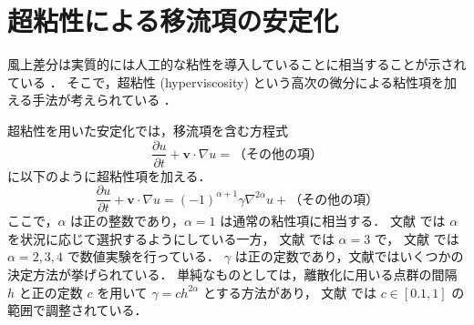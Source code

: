 \section{超粘性による移流項の安定化}\label{sec:pde_advection_hyperviscosity}

風上差分は実質的には人工的な粘性を導入していることに相当することが示されている \cite{Arakawa1994}．
そこで，超粘性 (hyperviscosity) という高次の微分による粘性項を加える手法が考えられている%
\cite{Shankar2018,Vaupotic2024,Rot2026}．

超粘性を用いた安定化では，移流項を含む方程式
\begin{equation}
    \frac{\partial u}{\partial t} + \bm{v} \cdot \nabla u = \text{（その他の項）}
\end{equation}
に以下のように超粘性項を加える．
\begin{equation}
    \frac{\partial u}{\partial t} + \bm{v} \cdot \nabla u = (-1)^{\alpha + 1} \gamma \nabla^{2\alpha} u + \text{（その他の項）}
\end{equation}
ここで，$\alpha$ は正の整数であり，$\alpha = 1$ は通常の粘性項に相当する．
文献 \cite{Shankar2018} では $\alpha$ を状況に応じて選択するようにしている一方，
文献 \cite{Vaupotic2024} では $\alpha=3$ で，
文献 \cite{Rot2026} では $\alpha=2,3,4$ で数値実験を行っている．
$\gamma$ は正の定数であり，文献ではいくつかの決定方法が挙げられている．
単純なものとしては，離散化に用いる点群の間隔 $h$ と正の定数 $c$ を用いて
$\gamma = c h^{2\alpha}$ とする方法があり，
文献 \cite{Rot2026} では $c \in [0.1, 1]$ の範囲で調整されている．
